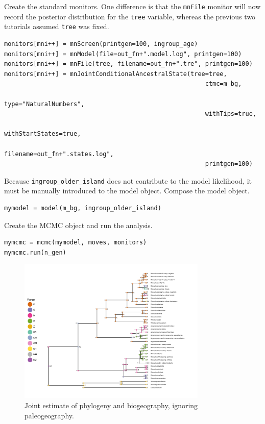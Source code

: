 Create the standard monitors.
One difference is that the {\tt mnFile} monitor will now record the posterior distribution for the {\tt tree} variable, whereas the previous two tutorials assumed {\tt tree} was fixed.

\begin{snugshade}
\begin{lstlisting}
monitors[mni++] = mnScreen(printgen=100, ingroup_age)
monitors[mni++] = mnModel(file=out_fn+".model.log", printgen=100)
monitors[mni++] = mnFile(tree, filename=out_fn+".tre", printgen=100)
monitors[mni++] = mnJointConditionalAncestralState(tree=tree,
                                                       ctmc=m_bg,
                                                       type="NaturalNumbers",
                                                       withTips=true,
                                                       withStartStates=true,
                                                       filename=out_fn+".states.log",
                                                       printgen=100)
\end{lstlisting}
\end{snugshade}


Because {\tt ingroup\_older\_island} does not contribute to the model likelihood, it must be manually introduced to the model object.
Compose the model object.

\begin{snugshade}
\begin{lstlisting}
mymodel = model(m_bg, ingroup_older_island)
\end{lstlisting}
\end{snugshade}

Create the MCMC object and run the analysis.

\begin{snugshade}
\begin{lstlisting}
mymcmc = mcmc(mymodel, moves, monitors)
mymcmc.run(n_gen)
\end{lstlisting}
\end{snugshade}

\begin{figure}[!h]
\centering
\includegraphics[width=0.8\textwidth]{figures/fig_simple_phy_RevGadgets_ase.pdf}
\caption{Joint estimate of phylogeny and biogeography, ignoring paleogeography.}
\label{fig:simple_phy}
\end{figure}

